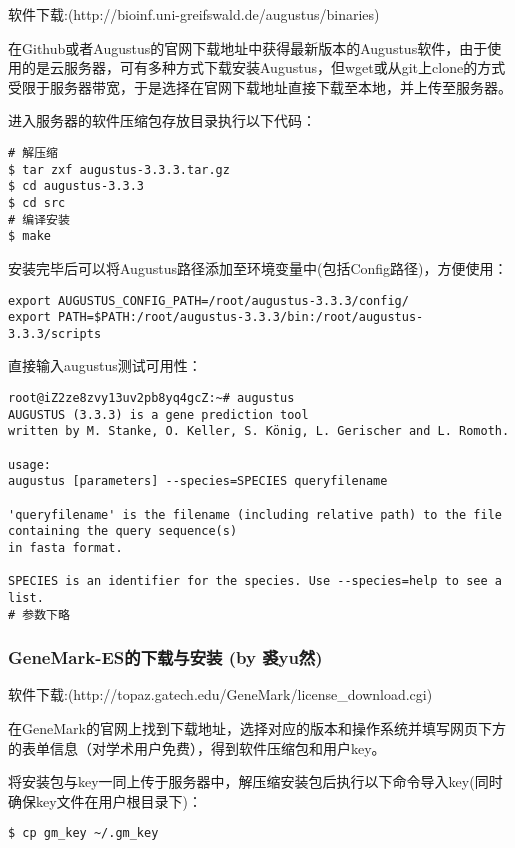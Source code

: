 \documentclass[12pt]{ctexart}
\begin{document}
软件下载:(http://bioinf.uni-greifswald.de/augustus/binaries)

在Github或者Augustus的官网下载地址中获得最新版本的Augustus软件\citep{10.1093/nar/gki458}，由于使用的是云服务器，可有多种方式下载安装Augustus，但wget或从git上clone的方式受限于服务器带宽，于是选择在官网下载地址直接下载至本地，并上传至服务器。

进入服务器的软件压缩包存放目录执行以下代码：

\begin{lstlisting}
# 解压缩
$ tar zxf augustus-3.3.3.tar.gz  
$ cd augustus-3.3.3
$ cd src  
# 编译安装
$ make 
\end{lstlisting}

安装完毕后可以将Augustus路径添加至环境变量中(包括Config路径)，方便使用：

\begin{lstlisting}
export AUGUSTUS_CONFIG_PATH=/root/augustus-3.3.3/config/
export PATH=$PATH:/root/augustus-3.3.3/bin:/root/augustus-3.3.3/scripts
\end{lstlisting}

直接输入augustus测试可用性：

\begin{lstlisting}
root@iZ2ze8zvy13uv2pb8yq4gcZ:~# augustus
AUGUSTUS (3.3.3) is a gene prediction tool
written by M. Stanke, O. Keller, S. König, L. Gerischer and L. Romoth.

usage:
augustus [parameters] --species=SPECIES queryfilename

'queryfilename' is the filename (including relative path) to the file containing the query sequence(s)
in fasta format.

SPECIES is an identifier for the species. Use --species=help to see a list.
# 参数下略
\end{lstlisting}

\subsubsection{GeneMark-ES的下载与安装 (by 裘yu然)}

软件下载:(http://topaz.gatech.edu/GeneMark/license\_download.cgi)

在GeneMark的官网上找到下载地址，选择对应的版本和操作系统并填写网页下方的表单信息（对学术用户免费），得到软件压缩包和用户key\citep{10.1093/nar/gki937}。

将安装包与key一同上传于服务器中，解压缩安装包后执行以下命令导入key(同时确保key文件在用户根目录下)：

\begin{lstlisting}
$ cp gm_key ~/.gm_key
\end{lstlisting}
\end{document}
